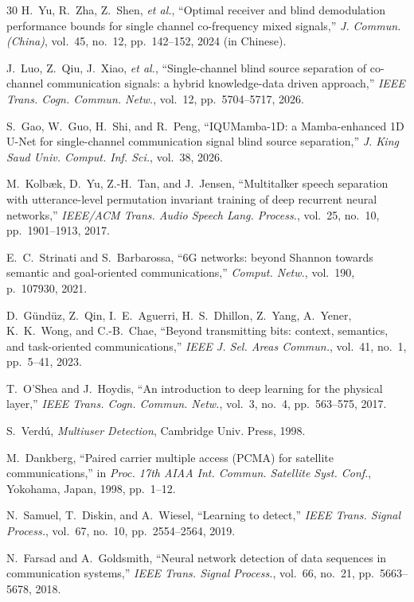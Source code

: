 \documentclass[journal]{IEEEtran}
\begin{document}
\begin{thebibliography}{30}
H.~Yu, R.~Zha, Z.~Shen, \emph{et al.},
``Optimal receiver and blind demodulation performance bounds for
single channel co-frequency mixed signals,''
\emph{J. Commun. (China)}, vol.~45, no.~12, pp.~142--152, 2024
(in Chinese).

J.~Luo, Z.~Qiu, J.~Xiao, \emph{et al.},
``Single-channel blind source separation of co-channel communication
signals: a hybrid knowledge-data driven approach,''
\emph{IEEE Trans. Cogn. Commun. Netw.}, vol.~12, pp.~5704--5717, 2026.

S.~Gao, W.~Guo, H.~Shi, and R.~Peng,
``IQUMamba-1D: a Mamba-enhanced 1D U-Net for single-channel
communication signal blind source separation,''
\emph{J. King Saud Univ. Comput. Inf. Sci.}, vol.~38, 2026.

M.~Kolb{\ae}k, D.~Yu, Z.-H.~Tan, and J.~Jensen,
``Multitalker speech separation with utterance-level permutation
invariant training of deep recurrent neural networks,''
\emph{IEEE/ACM Trans. Audio Speech Lang. Process.}, vol.~25, no.~10,
pp.~1901--1913, 2017.

E.~C.~Strinati and S.~Barbarossa,
``6G networks: beyond Shannon towards semantic and goal-oriented
communications,''
\emph{Comput. Netw.}, vol.~190, p.~107930, 2021.

D.~G{\"u}nd{\"u}z, Z.~Qin, I.~E.~Aguerri, H.~S.~Dhillon, Z.~Yang,
A.~Yener, K.~K.~Wong, and C.-B.~Chae,
``Beyond transmitting bits: context, semantics, and task-oriented
communications,''
\emph{IEEE J. Sel. Areas Commun.}, vol.~41, no.~1, pp.~5--41, 2023.

T.~O'Shea and J.~Hoydis,
``An introduction to deep learning for the physical layer,''
\emph{IEEE Trans. Cogn. Commun. Netw.}, vol.~3, no.~4, pp.~563--575,
2017.

S.~Verd{\'u},
\emph{Multiuser Detection},
Cambridge Univ. Press, 1998.

M.~Dankberg,
``Paired carrier multiple access (PCMA) for satellite communications,''
in \emph{Proc. 17th AIAA Int. Commun. Satellite Syst. Conf.},
Yokohama, Japan, 1998, pp.~1--12.

N.~Samuel, T.~Diskin, and A.~Wiesel,
``Learning to detect,''
\emph{IEEE Trans. Signal Process.}, vol.~67, no.~10, pp.~2554--2564,
2019.

N.~Farsad and A.~Goldsmith,
``Neural network detection of data sequences in communication systems,''
\emph{IEEE Trans. Signal Process.}, vol.~66, no.~21, pp.~5663--5678,
2018.


\end{thebibliography}
\end{document}
